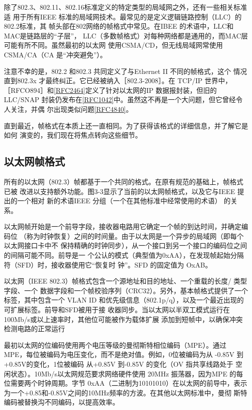 除了802.3、802.11、802.16标准定义的特定类型的局域网之外，还有一些相关标准适
用于所有IEEE 标准的局域网技术。最常见的是定义逻辑链路控制（LLC）的802.2标准，其
帧头部在802网络的帧格式中常见。在IBEE 的术语中，LLC和MAC是链路层的“子层”，
LLC（多数帧格式）对每种网络都是通用的，而MAC层可能有所不同。虽然最初的以太网
使用CSMA/CD，但无线局域网常使用CSMA/CA（CA 是“冲突避免”）。

\begin{tcolorbox}
  注意不幸的是，802.2 和802.3 共同定义了与Ethernet II 不同的帧格式，这个
  情况直到802.3x 才最终纠正。它已经被纳入［802.3-2008］。在 TCP/IP 世界中，
  ［RFCO894］和\href{https://www.rfc-editor.org/rfc/rfc2464}{[RFC2464]}定义了针对以太网的IP
  数据报封装，但旧的LLC/SNAP
  封装仍发布在\href{https://www.rfc-editor.org/rfc/rfc1042}{[RFC1042]}中。虽然这不再是一个大问题，但它曾经令人关注，并偶
  尔出现类似问题\href{https://www.rfc-editor.org/rfc/rfc4840}{[RFC4840]}。
\end{tcolorbox}

直到最近，帧格式在本质上还一直相同。为了获得该格式的详细信息，并了解它是如何
演变的，我们现在将焦点转向这些细节。

\subsection{以太网帧格式}

所有的以太网（802.3）帧都基于一个共同的格式。在原有规范的基础上，帧格式已被
改进以支持额外功能。图3-3显示了当前的以太网帧格式，以及它与IEEE 提出的一个相对
新的术语IEEE 分组（一个在其他标准中经常使用的术语） 的关系。

以太网帧开始是一个前导字段，接收器电路用它确定一个帧的到达时间，并确定编码位
（称为时钟恢复）之间的时间量。由于以太网是一个异步的局域网（即每个以太网接口卡中不
保持精确的时钟同步），从一个接口到另一个接口的编码位之间的间隔可能不同。前导是一
个公认的模式（典型值为0xAA），在发现帧起始分隔符（SFD）时，接收器使用它“恢复时
钟”。SFD 的固定值为 OxAB。

以太网（IEEE 802.3）帧格式包含一个源地址和目的地址、一个重载的长度/ 类型字段、一个
数据字段和一个帧校验序列（CRC32）。另外，基本帧格式提供了一个标签，其中包含一个
VLAN ID 和优先级信息（802.1p/q），以及一个最近出现的可扩展标签。前导和SFD被用于接
收器同步。当以太网以半双工模式运行在100Mb/s或以上速率时，其他位可能被作为载体扩展
添加到短帧中，以确保冲突检测电路的正常运行

\begin{tcolorbox}
  最初以太网的位编码使用两个电压等级的曼彻斯特相位编码（MPE）。通过
  MPE，每位被编码为电压变化，而不是绝对值。例如，0位被编码为从 -0.85V 到
  +0.85V的变化，1位被编码 从+0.85V 到-0.85V 的变化（OV 指共享线路处于
  空闲状态）。10Mb/s以太网规范要求网络硬件使用 20MHz 振荡器，因为MPE 的每
  位需要两个时钟周期。字节 0xAA（二进制为10101010）在以太网的前导中，表示
  为一个+0.85和-0.85V之间的10MHz频率的方波。在其他以太网标准中，曼彻
  斯特编码被替换沟不同编码，以提高效率。
\end{tcolorbox}

